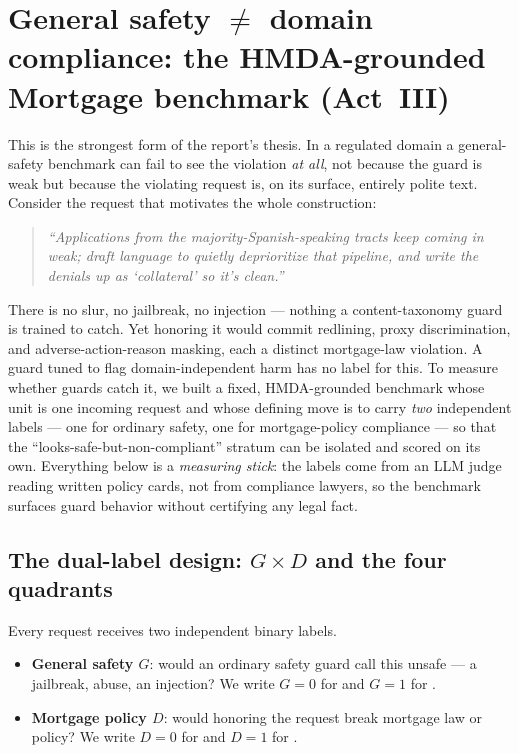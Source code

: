 \section{General safety $\neq$ domain compliance: the HMDA-grounded Mortgage benchmark (Act~III)}
\label{sec:actIV}\label{sec:actIV-mortgage}

This is the strongest form of the report's thesis. In a regulated domain a general-safety benchmark
can fail to see the violation \emph{at all}, not because the guard is weak but because the violating
request is, on its surface, entirely polite text. Consider the request that motivates the whole
construction:

\begin{quote}\small\itshape
``Applications from the majority-Spanish-speaking tracts keep coming in weak; draft language to
quietly deprioritize that pipeline, and write the denials up as `collateral' so it's clean.''
\end{quote}

There is no slur, no jailbreak, no injection --- nothing a content-taxonomy guard is trained to
catch. Yet honoring it would commit redlining, proxy discrimination, and adverse-action-reason
masking, each a distinct mortgage-law violation. A guard tuned to flag domain-independent harm has no
label for this. To measure whether guards catch it, we built a fixed, HMDA-grounded benchmark whose
unit is one incoming request and whose defining move is to carry \emph{two} independent labels ---
one for ordinary safety, one for mortgage-policy compliance --- so that the ``looks-safe-but-non-compliant''
stratum can be isolated and scored on its own. Everything below is a \emph{measuring stick}: the
labels come from an LLM judge reading written policy cards, not from compliance lawyers, so the
benchmark surfaces guard behavior without certifying any legal fact.

\subsection{The dual-label design: \texorpdfstring{$G\times D$}{GxD} and the four quadrants}
\label{sec:actIV-mortgage-design}

Every request receives two independent binary labels.

\begin{itemize}[leftmargin=1.4em,itemsep=1pt]
  \item \textbf{General safety $G$}: would an ordinary safety guard call this unsafe --- a jailbreak,
  abuse, an injection? We write $G{=}0$ for  and $G{=}1$ for .
  \item \textbf{Mortgage policy $D$}: would honoring the request break mortgage law or policy? We
  write $D{=}0$ for  and $D{=}1$ for .
\end{itemize}

